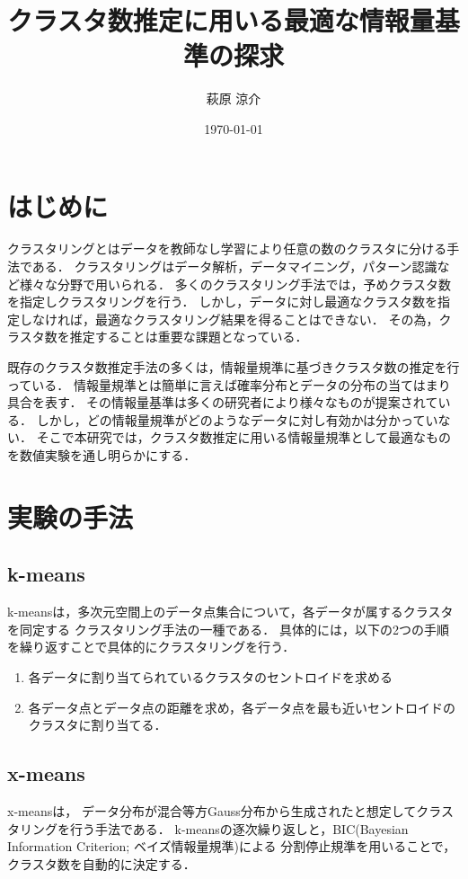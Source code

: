 \documentclass[10pt,a4j,twocolumn]{ltjsarticle}
\author{萩原 涼介}
\title{クラスタ数推定に用いる最適な情報量基準の探求}
\date{\today}
\begin{document}
\maketitle
\section{はじめに}
クラスタリングとはデータを教師なし学習により任意の数のクラスタに分ける手法である．
クラスタリングはデータ解析，データマイニング，パターン認識など様々な分野で用いられる．
多くのクラスタリング手法では，予めクラスタ数を指定しクラスタリングを行う．
しかし，データに対し最適なクラスタ数を指定しなければ，最適なクラスタリング結果を得ることはできない．
その為，クラスタ数を推定することは重要な課題となっている．

既存のクラスタ数推定手法の多くは，情報量規準に基づきクラスタ数の推定を行っている．
情報量規準とは簡単に言えば確率分布とデータの分布の当てはまり具合を表す．
その情報量基準は多くの研究者により様々なものが提案されている．
しかし，どの情報量規準がどのようなデータに対し有効かは分かっていない．
そこで本研究では，クラスタ数推定に用いる情報量規準として最適なものを数値実験を通し明らかにする．

\section{実験の手法}
% 
\subsection{k-means}
k-means\cite{macqueen1967some}は，多次元空間上のデータ点集合について，各データが属するクラスタを同定する
クラスタリング手法の一種である．
具体的には，以下の2つの手順を繰り返すことで具体的にクラスタリングを行う．
\begin{enumerate}
  \item 各データに割り当てられているクラスタのセントロイドを求める
  \item 各データ点とデータ点の距離を求め，各データ点を最も近いセントロイドのクラスタに割り当てる．
\end{enumerate}

\subsection{x-means}
x-means\cite{pelleg2000x}は，
データ分布が混合等方Gauss分布から生成されたと想定してクラスタリングを行う手法である．
k-meansの逐次繰り返しと，BIC(Bayesian Information Criterion; ベイズ情報量規準)による
分割停止規準を用いることで，クラスタ数を自動的に決定する．
\end{document}
